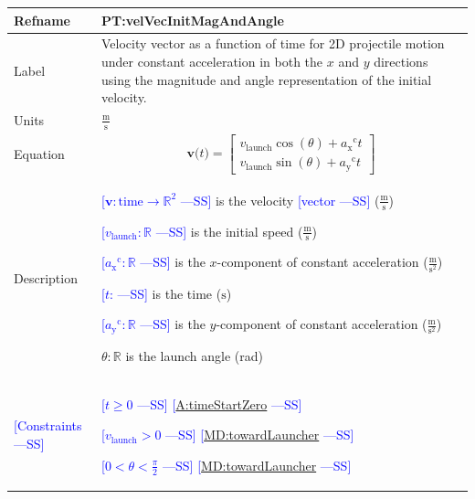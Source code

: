\documentclass[12pt]{article}
\newcommand{\authornote}[3]{\textcolor{#1}{[#3 ---#2]}}
\newcommand{\authornote}[3]{}
\newcommand{\wss}[1]{\authornote{blue}{SS}{#1}}
\begin{document}
\noindent
\begin{minipage}{\textwidth}
\begin{tabular}{>{\raggedright}p{}>{\raggedright\arraybackslash}p{}}
\toprule \textbf{Refname} & \textbf{PT:velVecInitMagAndAngle}
\label{PT:velVecInitMagAndAngle}
\\ \midrule
Label & Velocity vector as a function of time for 2D projectile motion under
constant acceleration in both the $x$ and $y$ directions using the magnitude and
angle representation of the initial velocity.
        
\\ \midrule
Units & $\frac{\text{m}}{\text{s}}$
        
\\ \midrule
Equation & \begin{displaymath}
           \symbf{v}\text{(}t\text{)}=\begin{bmatrix}
                                      {{v}_{\text{launch}}} \cos(\theta)+{{a_{\text{x}}}^{\text{c}}} t\\
                                      {{v}_{\text{launch}}} \sin(\theta)+{{a_{\text{y}}}^{\text{c}}} t
                                      \end{bmatrix}
           \end{displaymath}
\\ \midrule
Description & \begin{symbDescription}
              \item{\wss{$\symbf{v}: \text{time} \rightarrow \mathbb{R}^2$} is the velocity \wss{vector} ($\frac{\text{m}}{\text{s}}$)}
              \item{\wss{${{v}_{\text{launch}}}: \mathbb{R}$} is the initial speed ($\frac{\text{m}}{\text{s}}$)}
              \item{\wss{${{a_{\text{x}}}^{\text{c}}}: \mathbb{R}$} is the $x$-component of constant acceleration ($\frac{\text{m}}{\text{s}^{2}}$)}
              \item{\wss{$t$: \text{time}} is the time (${\text{s}}$)}
              \item{\wss{${{a_{\text{y}}}^{\text{c}}}: \mathbb{R}$} is the $y$-component of constant acceleration ($\frac{\text{m}}{\text{s}^{2}}$)}
              \item $\theta: \mathbb{R}$ is the launch angle (rad)
              \end{symbDescription}

\\ \midrule
\wss{Constraints} & 
\begin{symbDescription}
\item \wss{$t \geq 0$} \wss{\hyperref[timeStartZero]{A:timeStartZero}}
\item \wss{$v_\text{launch} > 0$} \wss{\hyperref[MD:towardLauncher]{MD:towardLauncher}}
\item \wss{$
0 < \theta < \frac{\pi}{2}$} \wss{\hyperref[MD:towardLauncher]{MD:towardLauncher}}
\end{symbDescription}


\end{tabular}
\end{minipage}
\end{document}
